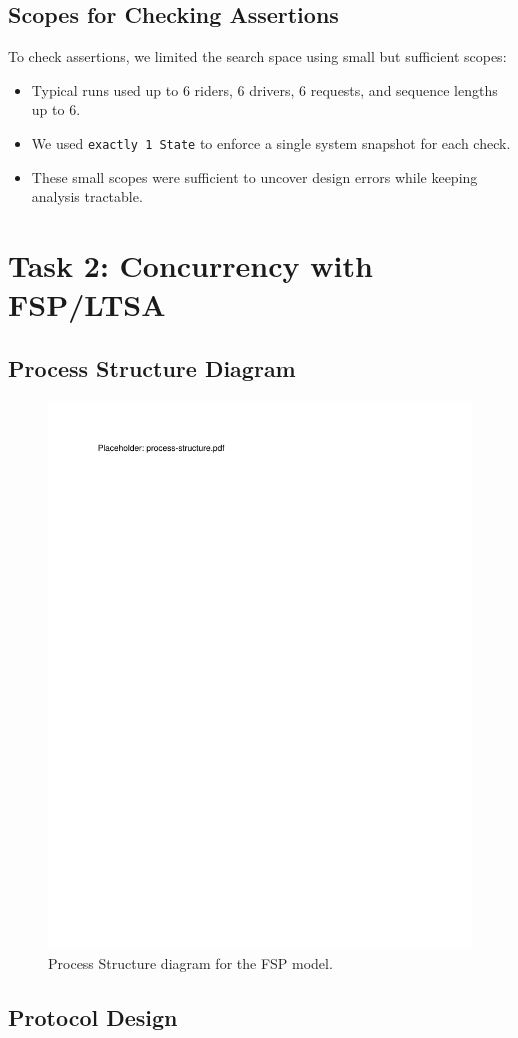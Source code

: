 \documentclass[11pt]{article}
\begin{document}
\subsection{Scopes for Checking Assertions}

To check assertions, we limited the search space using small but sufficient scopes:
\begin{itemize}[leftmargin=1.5em]
  \item Typical runs used up to 6 riders, 6 drivers, 6 requests, and sequence lengths up to 6.
  \item We used \texttt{exactly 1 State} to enforce a single system snapshot for each check.
  \item These small scopes were sufficient to uncover design errors while keeping analysis tractable.
\end{itemize}

\section{Task 2: Concurrency with FSP/LTSA}
\label{sec:task2}

\subsection{Process Structure Diagram}

\label{sec:process-structure}
\begin{figure}[h]
  \centering
  \includegraphics[width=0.50\linewidth]{figs/process-structure.pdf}
  \caption{Process Structure diagram for the FSP model.}
\end{figure}

\subsection{Protocol Design}
\end{document}
